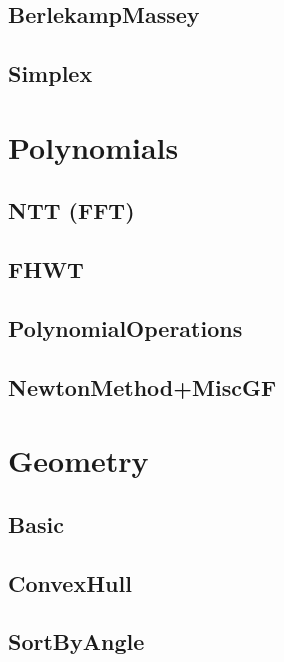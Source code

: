 	\subsection{BerlekampMassey}
	
	\subsection{Simplex}
	
	
\section{Polynomials}
	\subsection{NTT (FFT)}
	
	
	\subsection{FHWT}
	
	\subsection{PolynomialOperations}
	
	\subsection{NewtonMethod+MiscGF}
	
\section{Geometry}
	\subsection{Basic}
	
	\subsection{ConvexHull}
	
	\subsection{SortByAngle}
	
